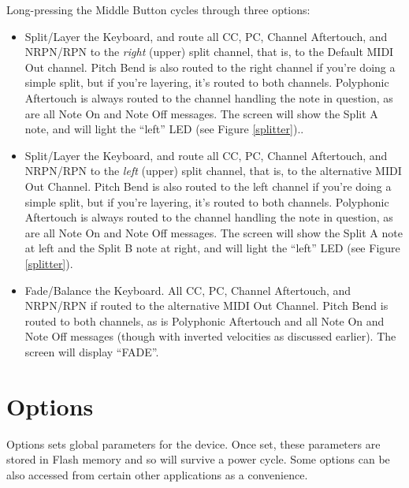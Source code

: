 \documentclass{article}
\begin{document}
Long-pressing the Middle Button cycles through three options:
\begin{itemize}
\item Split/Layer the Keyboard, and route all CC, PC, Channel Aftertouch, and NRPN/RPN to the {\it right} (upper) split channel, that is, to the Default MIDI Out channel.  Pitch Bend is also routed to the right channel if you're doing a simple split, but if you're layering, it's routed to both channels.  Polyphonic Aftertouch is always routed to the channel handling the note in question, as are all Note On and Note Off messages.  The screen will show the Split A note, and will light the ``left'' LED (see Figure \ref{splitter})..
\item Split/Layer the Keyboard, and route all CC, PC, Channel Aftertouch, and NRPN/RPN to the {\it left} (upper) split channel, that is, to the alternative MIDI Out Channel.  Pitch Bend is also routed to the left channel if you're doing a simple split, but if you're layering, it's routed to both channels.  Polyphonic Aftertouch is always routed to the channel handling the note in question, as are all Note On and Note Off messages.  The screen will show the Split A note at left and the Split B note at right, and will light the ``left'' LED (see Figure \ref{splitter}).
\item Fade/Balance the Keyboard.  All CC, PC, Channel Aftertouch, and NRPN/RPN if routed to the alternative MIDI Out Channel.  Pitch Bend is routed to both channels, as is Polyphonic Aftertouch and all Note On and Note Off messages (though with inverted velocities as discussed earlier).  The screen will display ``FADE''.
\end{itemize}

\section {Options}
\label{options}

	Options sets global parameters for the device.  Once set, these parameters are stored in Flash memory and so will survive a power cycle.  Some options can be also accessed from certain other applications as a convenience.  
	
\end{document}
